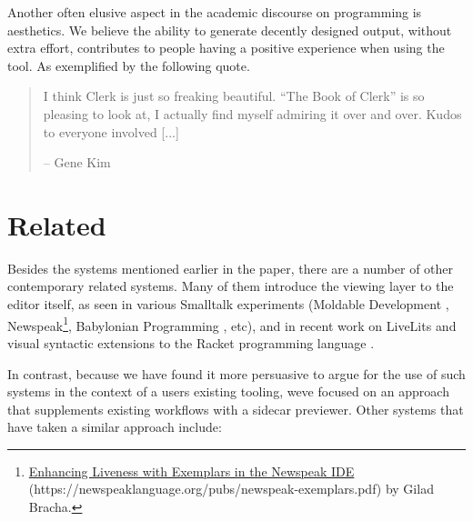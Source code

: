 \documentclass[sigconf,screen]{acmart}
\begin{document}
Another often elusive aspect in the academic discourse on programming is aesthetics. We believe the ability to generate decently designed output, without extra effort, contributes to  people having a positive experience when using the tool. As exemplified by the following quote.

\begin{quote}
I think Clerk is just so freaking beautiful. ``The Book of Clerk'' is so pleasing to look at, I actually find myself admiring it over and over. Kudos to everyone involved {[}...{]}

-- Gene Kim
\end{quote}

\hypertarget{related}{%
\section{Related}\label{related}}

Besides the systems mentioned earlier in the paper, there are a number of other contemporary related systems. Many of them introduce the viewing layer to the editor itself, as seen in various Smalltalk experiments (Moldable Development \cite{Chi__2015},  Newspeak\footnote{{\href{https://newspeaklanguage.org/pubs/newspeak-exemplars.pdf}{Enhancing Liveness with Exemplars in the Newspeak IDE} (https://newspeaklanguage.org/pubs/newspeak-exemplars.pdf)} by Gilad Bracha.},  Babylonian Programming \cite{Rauch_2019}, etc), and in recent work on LiveLits \cite{Omar_2021} and visual syntactic extensions to the Racket programming language \cite{Andersen_2020}.

In contrast, because we have found it more persuasive to argue for the use of such systems in the context of a user\textquotesingle s existing tooling, we\textquotesingle ve focused on an approach that supplements existing workflows with a sidecar previewer. Other systems that have taken a similar approach include:
\end{document}
